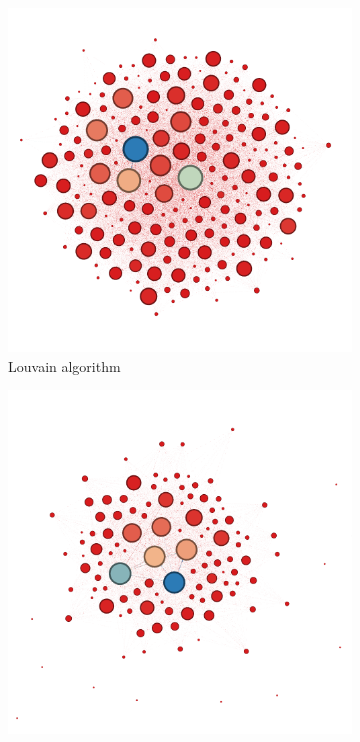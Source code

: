 \vspace{-20pt}
\begin{figure}[h]
    \centering
    \begin{subfigure}{0.3\linewidth}
        \centering
        \includegraphics[width=\linewidth]{images/sub_bipartite_communities_num_games.png}
        \caption{Louvain algorithm}
        \label{fig:figure1}
    \end{subfigure}
    \hspace{0.02\linewidth}
    \begin{subfigure}{0.3\linewidth}
        \centering
        \includegraphics[width=\linewidth]{images/infomap_communities_num_games.png}

\end{subfigure}
\end{figure}
